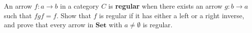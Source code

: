 An arrow $f: a \rightarrow b$ in a category $C$ is \textbf{regular} when there exists an arrow $g: b \rightarrow a$ such that $fgf = f$. Show that $f$ is regular if it has either a left or a right inverse, and prove that every arrow in $\mathbf{Set}$ with $a \neq \emptyset$ is regular.
